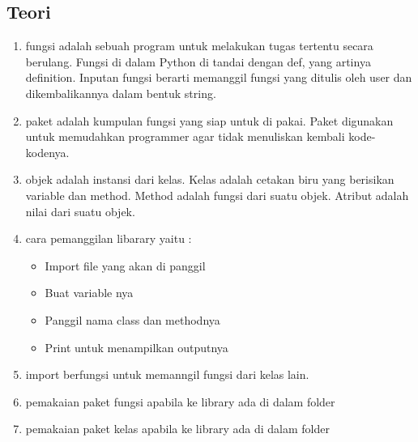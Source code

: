 \subsection{Teori}
\begin{enumerate}

\item fungsi adalah sebuah program untuk melakukan tugas tertentu secara berulang. Fungsi di dalam Python di tandai dengan def, yang artinya definition.
Inputan fungsi berarti memanggil fungsi yang ditulis oleh user dan dikembalikannya dalam bentuk string.


\item paket adalah kumpulan fungsi yang siap untuk di pakai. Paket digunakan untuk memudahkan programmer agar tidak menuliskan kembali kode-kodenya.


\item objek adalah instansi dari kelas. Kelas adalah cetakan biru yang berisikan variable dan method. Method adalah fungsi dari suatu objek. Atribut adalah nilai dari suatu objek.


\item cara pemanggilan libarary yaitu :

\begin{itemize}

\item Import file yang akan di panggil
\item Buat variable nya
\item Panggil nama class dan methodnya
\item Print untuk menampilkan outputnya


\end{itemize}

\item import berfungsi untuk memanngil fungsi dari kelas lain.


\item pemakaian paket fungsi apabila ke library ada di dalam folder


\item pemakaian paket kelas apabila ke library ada di dalam folder

\end{enumerate}

